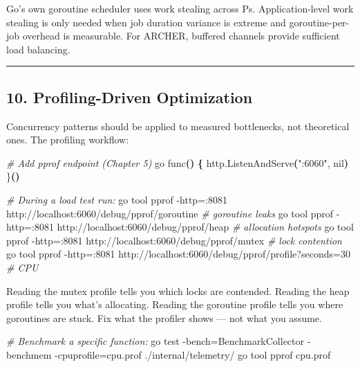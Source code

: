 \documentclass[
]{article}
\newenvironment{Shaded}{}{}
\newcommand{\AttributeTok}[1]{\textcolor[rgb]{0.49,0.56,0.16}{#1}}
\newcommand{\CommentTok}[1]{\textcolor[rgb]{0.38,0.63,0.69}{\textit{#1}}}
\newcommand{\ErrorTok}[1]{\textcolor[rgb]{1.00,0.00,0.00}{\textbf{#1}}}
\newcommand{\ExtensionTok}[1]{#1}
\newcommand{\KeywordTok}[1]{\textcolor[rgb]{0.00,0.44,0.13}{\textbf{#1}}}
\newcommand{\NormalTok}[1]{#1}
\newcommand{\OperatorTok}[1]{\textcolor[rgb]{0.40,0.40,0.40}{#1}}
\newcommand{\PreprocessorTok}[1]{\textcolor[rgb]{0.74,0.48,0.00}{#1}}
\newcommand{\StringTok}[1]{\textcolor[rgb]{0.25,0.44,0.63}{#1}}
\begin{document}
Go's own goroutine scheduler uses work stealing across Ps.
Application-level work stealing is only needed when job duration
variance is extreme and goroutine-per-job overhead is measurable. For
ARCHER, buffered channels provide sufficient load balancing.

\begin{center}\rule{0.5\linewidth}{0.5pt}\end{center}

\hypertarget{profiling-driven-optimization}{%
\subsection{10. Profiling-Driven
Optimization}\label{profiling-driven-optimization}}

Concurrency patterns should be applied to measured bottlenecks, not
theoretical ones. The profiling workflow:

\begin{Shaded}
\begin{Highlighting}[]
\CommentTok{\# Add pprof endpoint (Chapter 5)}
\ExtensionTok{go}\NormalTok{ func}\ErrorTok{(}\KeywordTok{)} \KeywordTok{\{} \ExtensionTok{http.ListenAndServe}\ErrorTok{(}\StringTok{":6060"}\ExtensionTok{,}\NormalTok{ nil}\KeywordTok{)} \ExtensionTok{\}}\ErrorTok{(}\KeywordTok{)}

\CommentTok{\# During a load test run:}
\ExtensionTok{go}\NormalTok{ tool pprof }\AttributeTok{{-}http}\OperatorTok{=}\NormalTok{:8081 http://localhost:6060/debug/pprof/goroutine   }\CommentTok{\# goroutine leaks}
\ExtensionTok{go}\NormalTok{ tool pprof }\AttributeTok{{-}http}\OperatorTok{=}\NormalTok{:8081 http://localhost:6060/debug/pprof/heap        }\CommentTok{\# allocation hotspots}
\ExtensionTok{go}\NormalTok{ tool pprof }\AttributeTok{{-}http}\OperatorTok{=}\NormalTok{:8081 http://localhost:6060/debug/pprof/mutex       }\CommentTok{\# lock contention}
\ExtensionTok{go}\NormalTok{ tool pprof }\AttributeTok{{-}http}\OperatorTok{=}\NormalTok{:8081 http://localhost:6060/debug/pprof/profile}\PreprocessorTok{?}\NormalTok{seconds=30 }\CommentTok{\# CPU}
\end{Highlighting}
\end{Shaded}

Reading the mutex profile tells you which locks are contended. Reading
the heap profile tells you what's allocating. Reading the goroutine
profile tells you where goroutines are stuck. Fix what the profiler
shows --- not what you assume.

\begin{Shaded}
\begin{Highlighting}[]
\CommentTok{\# Benchmark a specific function:}
\ExtensionTok{go}\NormalTok{ test }\AttributeTok{{-}bench}\OperatorTok{=}\NormalTok{BenchmarkCollector }\AttributeTok{{-}benchmem} \AttributeTok{{-}cpuprofile}\OperatorTok{=}\NormalTok{cpu.prof ./internal/telemetry/}
\ExtensionTok{go}\NormalTok{ tool pprof cpu.prof}
\end{Highlighting}
\end{Shaded}
\end{document}
